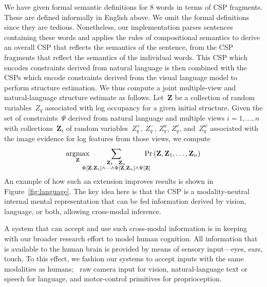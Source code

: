 \par\noindent
We have given formal semantic definitions for $8$ words in terms of CSP
fragments.
%
These are defined informally in English above.
%
We omit the formal definitions since they are tedious.
%
Nonetheless, our implementation parses sentences containing these words and
applies the rules of compositional semantics to derive an overall CSP that
reflects the semantics of the sentence, from the CSP fragments that reflect the
semantics of the individual words.
%
This CSP which encodes constraints derived from natural language is then
combined with the CSPs which encode constraints derived from the visual
language model to perform structure estimation.
%
We thus compute a joint multiple-view and natural-language structure estimate
as follows.
%
Let~$\mathbf{Z}$ be a collection of random variables~$Z_q$ associated with log
occupancy for a given initial structure.
%
Given the set of constraints~$\Psi$ derived from natural language
and multiple views $i=1,\ldots,n$ with collections~$\mathbf{Z}_i$ of random
variables~$Z^+_q$, $Z^-_q$, $Z^u_q$, $Z^v_q$, and~$Z^w_q$ associated with the
image evidence for log features from those views, we compute
%
\begin{equation*}
  \argmax_{\mathbf{Z}}\hspace{-12pt}
  \sum_{\substack{\mathbf{Z}_1\ldots\mathbf{Z}_n\\
      \Phi\left[\mathbf{Z},\mathbf{Z}_1\right]\wedge\cdots\wedge\Phi\left[\mathbf{Z},\mathbf{Z}_n\right]\wedge\Psi\left[\mathbf{Z}\right]}}
  \hspace{-10pt}\Pr\left(\mathbf{Z},\mathbf{Z}_1,\ldots,\mathbf{Z}_n\right)
\end{equation*}
%
An example of how such an extension improves results is shown in
Figure~\ref{fig:language}.
%
The key idea here is that the CSP is a modality-neutral internal mental
representation that can be fed information derived by vision, language, or
both, allowing cross-modal inference.

A system that can accept and use such cross-modal information is in keeping
with our broader research effort to model human cognition.
%
All information that is available to the human brain is provided by means of
sensory input---eyes, ears, touch, \etc
%
To this effect, we fashion our systems to accept inputs with the same
modalities as humans; \ie\ raw camera input for vision, natural-language text
or speech for language, and motor-control primitives for proprioception.

\par\vspace{-1ex}
